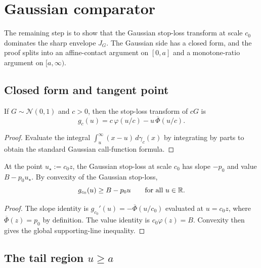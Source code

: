 \chapter{Gaussian comparator}\label{chap:gaussian-comparator}

The remaining step is to show that the Gaussian stop-loss transform at
scale $c_0$ dominates the sharp envelope $J_G$. The Gaussian side has a
closed form, and the proof splits into an affine-contact argument on
$[0,a]$ and a monotone-ratio argument on $[a,\infty)$.

\section{Closed form and tangent point}

\begin{lemma}\label{lem:gaussian-call}
\leanok
If $G \sim \mathcal N(0,1)$ and $c>0$, then the stop-loss transform of $cG$ is
\[
  g_c(u) = c\,\varphi(u/c) - u\,\overline{\Phi}(u/c).
\]
\end{lemma}

\begin{proof}\leanok
Evaluate the integral $\int_u^\infty (x-u)\,d\gamma_c(x)$ by integrating
by parts to obtain the standard Gaussian call-function formula.
\end{proof}

\begin{lemma}[Tangent-line contact at \(u_\star = c_0 z\)]\label{lem:gaussian-tangent}
\leanok
{}\leanok
At the point $u_\star := c_0 z$, the Gaussian stop-loss at scale $c_0$ has
slope $-p_0$ and value $B - p_0 u_\star$. By convexity of the
Gaussian stop-loss,
\[
  g_{c_0}(u) \ge B - p_0 u \qquad \text{for all } u \in \mathbb{R}.
\]
\end{lemma}

\begin{proof}\leanok
The slope identity is $g_{c_0}'(u)=-\overline{\Phi}(u/c_0)$ evaluated at
$u=c_0 z$, where $\overline{\Phi}(z)=p_0$ by definition. The value identity
is $c_0 \varphi(z)=B$. Convexity then gives the global supporting-line
inequality.
\end{proof}

\section{The tail region \(u \ge a\)}

